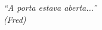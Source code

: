 \begin{epigrafe}
    \vspace*{\fill}
    \begin{flushright}

        \textit{“A porta estava aberta...”\\
        (Fred)}
    \end{flushright}
\end{epigrafe}